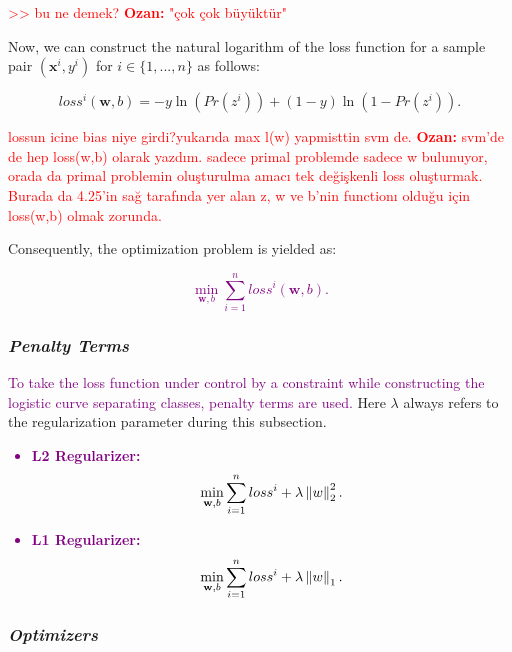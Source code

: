 \textcolor{red}{>> bu ne demek? \textbf{Ozan:} "çok çok büyüktür"}

Now, we can construct the natural logarithm of the loss function for a sample pair $(\textbf{x}^{i}, y^{i})$ for $i \in \{1, ..., n\}$ as follows:

\begin{equation}
\label{log_loss_onesample} 
loss^{i}(\textbf{w}, b) = -y\ln(Pr(z^{i}))  + (1-y)\ln(1-Pr(z^{i})).
\end{equation}

\textcolor{red}{lossun icine bias niye girdi?yukarıda max l(w) yapmisttin svm de. \textbf{Ozan:} svm'de de hep loss(w,b) olarak yazdım. sadece primal problemde sadece w bulunuyor, orada da primal problemin oluşturulma amacı tek değişkenli loss oluşturmak. Burada da 4.25'in sağ tarafında yer alan z, w ve b'nin functionı olduğu için loss(w,b) olmak zorunda.}


Consequently, the optimization problem is yielded as:

\textcolor{purple}{
\begin{equation}
\label{lr_optimization} 
\min_{\textbf{w}, b} \sum_{i=1}^{n} loss^{i}(\textbf{w}, b).
\end{equation}
}

\subsubsection*{\textit{Penalty Terms}}
\textcolor{purple}{To take the loss function under control by a constraint while constructing the logistic curve separating classes, penalty terms are used.} Here $\lambda$ always refers to the regularization parameter during this subsection.

\textcolor{purple}{
\begin{itemize}
    \item \textbf{L2 Regularizer:}
        \begin{equation}
        \label{lr_l1} 
        \min_{\textbf{w}, b} \sum_{i=1}^{n} loss^{i} + \lambda \left\lVert w\right\rVert_{2}^{2}.
        \end{equation}
    \item \textbf{L1 Regularizer:}
        \begin{equation}
        \label{lr_l1} 
        \min_{\textbf{w}, b} \sum_{i=1}^{n} loss^{i} + \lambda \left\lVert w\right\rVert_{1}.
        \end{equation}
\end{itemize}
}

\subsubsection*{\textit{Optimizers}}

